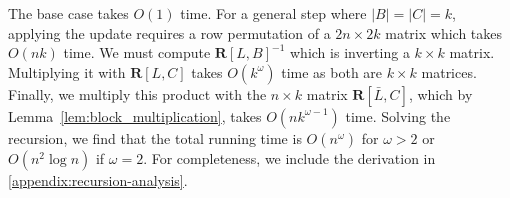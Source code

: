 \documentclass[10pt,a4paper]{article}
\newcommand{\matsize}[2]{#1\times #2}
\newcommand{\matexp}{\omega}
\newcommand{\mat}[1]{\mathbf{#1}}
\begin{document}
The base case takes $O(1)$ time. For a general step where $|B|=|C|=k$,  applying
the update requires a row permutation of a $\matsize{2n}{2k}$ matrix which takes
$O(nk)$ time. We must compute $\mat{R}[L,B]^{-1}$ which is inverting a $\matsize{k}{k}$ matrix.   Multiplying it with $\mat{R}[L,C]$  takes $O(k^{\matexp})$ time as both are $\matsize{k}{k}$ matrices. Finally, we 
multiply this product with the $\matsize{n}{k}$ matrix $\mat{R}[\bar{L},C]$, which by Lemma~\ref{lem:block_multiplication}, takes
$O(nk^{\matexp-1})$ time.
Solving
the recursion, we find that the total running time is  $O(n^{\matexp})$ for
$\matexp>2$ or $O(n^2\log n)$ if $\matexp=2$. For completeness, we include the
derivation in  \cref{appendix:recursion-analysis}.
\end{document}
